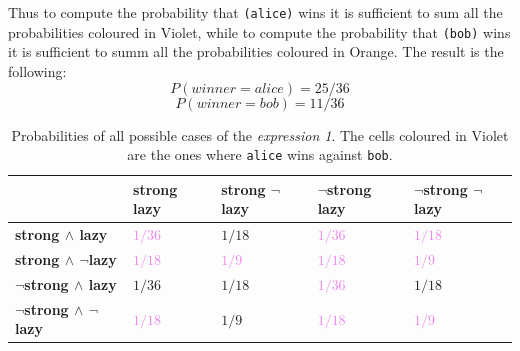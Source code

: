 \begin{itemize}
        Thus to compute the probability that \texttt{\textquotesingle (alice)} wins it is sufficient to sum all the probabilities coloured in Violet,
        while to compute the probability that \texttt{\textquotesingle (bob)} wins it is sufficient to summ all the probabilities coloured in Orange.
        The result is the following:
        \[ P(winner = alice) = 25 / 36 \]
        \[ P(winner = bob) = 11 / 36 \]
        \begin{table}[H]
            \centering
            \bgroup
                \def\arraystretch{1.5}
                \begin{tabular}{| l | C{1.8cm} C{1.8cm} C{1.8cm} C{1.8cm}  |}                    
                    \hline
                     & 
                        \textbf{strong lazy} & \textbf{strong $\neg$lazy} & \textbf{$\neg$strong lazy} & \textbf{$\neg$strong $\neg$lazy} \\
                    \hline

                    \textbf{strong $\land$ lazy} & \textcolor{Violet}{$1/36$} & \textcolor{RedOrange}{$1/18$} & 
                        \textcolor{Violet}{$1/36$} & \textcolor{Violet}{$1/18$} \\ 

                    \textbf{strong $\land$ $\neg$lazy} & \textcolor{Violet}{$1/18$} & \textcolor{Violet}{$1/9$} & 
                        \textcolor{Violet}{$1/18$} & \textcolor{Violet}{$1/9$} \\ 
                    
                    \textbf{$\neg$strong $\land$ lazy} & \textcolor{RedOrange}{$1/36$} & \textcolor{RedOrange}{$1/18$} & 
                        \textcolor{Violet}{$1/36$} & \textcolor{RedOrange}{$1/18$} \\ 
                    
                    \textbf{$\neg$strong $\land$ $\neg$lazy} & \textcolor{Violet}{$1/18$} & \textcolor{RedOrange}{$1/9$} & 
                        \textcolor{Violet}{$1/18$} & \textcolor{Violet}{$1/9$} \\
                    \hline
                \end{tabular}
            \egroup
            \caption{
                Probabilities of all possible cases of the \textit{expression 1}. The cells coloured in Violet are the ones where
                \texttt{\textquotesingle alice} wins against \texttt{\textquotesingle bob}.
            }
            \label{tab:exp-1}
        \end{table}
     

\end{itemize}
